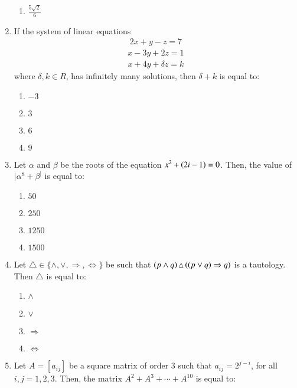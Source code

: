 \documentclass[journal,12pt,twocolumn]{IEEEtran}
\theoremstyle{remark}
\begin{document}
\begin{enumerate}
\begin{multicols}{2}
\begin{enumerate}
    \item $\frac{5\sqrt{2}}{6}$ 
\end{enumerate}
\end{multicols}
\bigskip
\item If the system of linear equations 
\begin{align*}
    2x+y-z=7
\end{align*}
\begin{align*}
    x-3y+2z=1
\end{align*}
\begin{align*}
    x+4y+\delta z=k
\end{align*}
where $\delta,k \in R$, has infinitely many solutions, then $\delta+k$ is equal to:
\begin{multicols}{2}
\begin{enumerate}
    \item $-3$
    \item $3$
    \item $6$
    \item $9$
\end{enumerate}
\end{multicols}
\bigskip
\item Let $\alpha$ and $\beta$ be the roots of the equation $x^2+\left(2i-1\right)=0$. Then, the value of $|\alpha^8+\beta^|$ is equal to:
\begin{multicols}{2}
\begin{enumerate}
       \item $50$
       \item $250$
       \item $1250$
       \item $1500$
\end{enumerate}
\end{multicols}
\bigskip
\item Let $\triangle \in \{\wedge, \vee, \Rightarrow, \Leftrightarrow\}$ be such that $\left(p \wedge q\right)\triangle\left(\left(p\vee q\right)\Rightarrow q\right)$ is a tautology. Then $\triangle$ is equal to:
\begin{multicols}{2}
\begin{enumerate}
    \item $\wedge$
    \item $\vee$
    \item $\Rightarrow$
    \item $\Leftrightarrow$
\end{enumerate}
\end{multicols}
\bigskip
\item Let $A=[a_{ij}]$ be a square matrix of order 3 such that $a_{ij}=2^{j-i}$, for all $i,j=1,2,3$. Then, the matrix $A^2+A^3+\cdots+A^{10}$ is equal to:

\end{enumerate}
\end{document}

